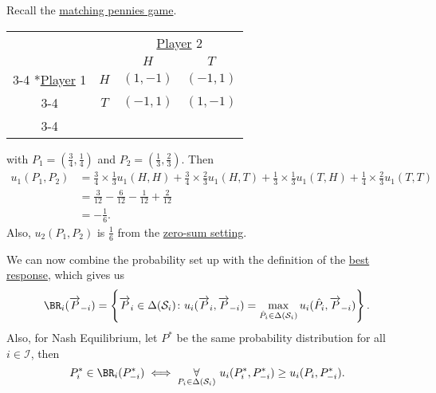 \begin{eg}
	Recall the \hyperref[eg:matching-pennies]{matching pennies game}.
	\begin{table}[H]
		\centering
		\setlength{\extrarowheight}{2pt}
		\begin{tabular}{cc|c|c|}
			                                               & \multicolumn{1}{c}{} & \multicolumn{2}{c}{\hyperref[def:player]{Player} 2}                           \\
			                                               & \multicolumn{1}{c}{} & \multicolumn{1}{c}{$H$}                             & \multicolumn{1}{c}{$T$} \\\cline{3-4}
			\multirow{2}*{\hyperref[def:player]{Player} 1} & $H$                  & $(1, -1)$                                           & $(-1, 1)$               \\\cline{3-4}
			                                               & $T$                  & $(-1, 1)$                                           & $(1, -1)$               \\\cline{3-4}
		\end{tabular}
	\end{table}
	with \(P_1 = (\frac{3}{4}, \frac{1}{4})\) and \(P_2 = (\frac{1}{3}, \frac{2}{3})\). Then
	\[
		\begin{split}
			u_1(P_1, P_2) & = \frac{3}{4}\times \frac{1}{3} u_1(H, H) + \frac{3}{4}\times \frac{2}{3}u_1(H, T) + \frac{1}{3}\times \frac{1}{3}u_1(T, H)+\frac{1}{4}\times \frac{2}{3}u_1(T, T) \\
			              & = \frac{3}{12} - \frac{6}{12} - \frac{1}{12} + \frac{2}{12}                                                                                                        \\
			              & = -\frac{1}{6}.
		\end{split}
	\]
	Also, \(u_2(P_1, P_2)\) is \(\frac{1}{6}\) from the \hyperref[def:zero-sum-game]{zero-sum setting}.
\end{eg}

We can now combine the probability set up with the definition of the \hyperref[def:best-response]{best response}, which gives us
\[
	\BR_{i}(\overrightarrow{P}_{-i}) = \left\{\overrightarrow{P}_i\in \Delta(\mathcal{S}_i)\colon u_{i}(\overrightarrow{P}_i, \overrightarrow{P}_{-i}) = \max_{\hat{P}_i\in \Delta(\mathcal{S}_i)}u_{i}(\hat{P}_i, \overrightarrow{P}_{-i})\right\}.
\]
Also, for Nash Equilibrium, let \(P^{\ast}\) be the same probability distribution for all \(i\in \mathcal{I} \), then
\[
	P^{\ast}_i\in\BR_i(P^{\ast}_{-i})\iff \underset{P_{i}\in \Delta(\mathcal{S}_i)}{\forall }\ u_{i}(P^{\ast}_i, P^{\ast}_{-i})\geq u_{i}(P_{i}, P^{\ast}_{-i}).
\]

